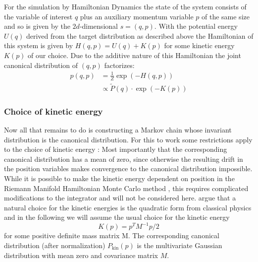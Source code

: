 For the simulation by Hamiltonian Dynamics the state of the system consists of the variable of interest $q$ plus an auxiliary momentum variable $p$ of the same size and so is given by the $2d$-dimensional $s = (q, p)$. With the potential energy $U(q)$ derived from the target distribution as described above the Hamiltonian of this system is given by $H(q, p) = U(q) + K(p)$ for some kinetic energy $K(p)$ of our choice. Due to the additive nature of this Hamiltonian the joint canonical distribution of $(q, p)$ factorizes:
\begin{equation}
\begin{split}
p(q, p) &= \frac{1}{Z} \exp \left( -H(q, p) \right) \\
			&\propto \tilde{P}(q) \cdot \exp{(-K(p))}
\end{split}
\end{equation}

\subsubsection{Choice of kinetic energy}
Now all that remains to do is constructing a Markov chain whose invariant distribution is the canonical distribution. For this to work some restrictions apply to the choice of kinetic energy \parencite{Betancourt2014}: Most importantly that the corresponding canonical distribution has a mean of zero, since otherwise the resulting drift in the position variables makes convergence to the canonical distribution impossible. While it is possible to make the kinetic energy dependent on position in the Riemann Manifold Hamiltonian Monte Carlo method \parencite{Girolami2011}, this requires complicated modifications to the integrator and will not be considered here. \parencite{Betancourt2014} argue that a natural choice for the kinetic energies is the quadratic form from classical physics and in the following we will assume the usual choice for the kinetic energy
\begin{equation} \label{eq:KineticEnergy}
K(p) = p^T M^{-1} p/2
\end{equation}
for some positive definite mass matrix M. The corresponding canonical distribution (after normalization) $P_\textrm{kin}(p)$ is the multivariate Gaussian distribution with mean zero and covariance matrix $M$.

